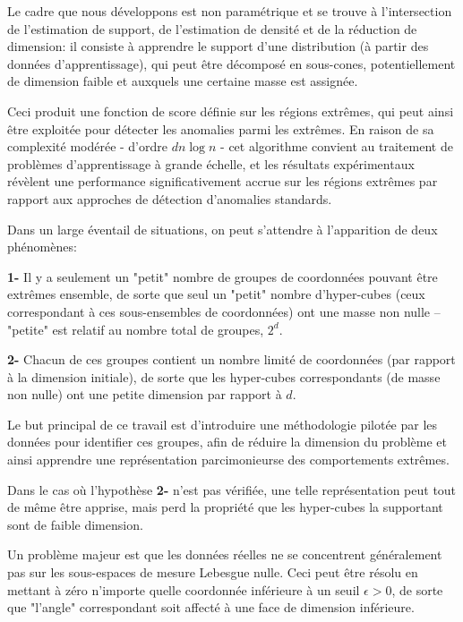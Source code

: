 Le cadre que nous développons est non paramétrique et se trouve à l'intersection de l'estimation de support, de l'estimation de densité et de la réduction de dimension: il consiste à apprendre le support d'une distribution (à partir des données d'apprentissage),  qui peut être décomposé en sous-cones, potentiellement de dimension faible et auxquels une certaine masse est assignée.%

Ceci produit une fonction de score définie sur les régions extrêmes, qui peut ainsi être exploitée pour détecter les anomalies parmi les extrêmes.
En raison de sa complexité modérée - d'ordre $ dn \log n $ - cet algorithme convient au traitement de problèmes d'apprentissage à grande échelle, et les résultats expérimentaux révèlent une performance significativement accrue sur les régions extrêmes par rapport aux approches de détection d'anomalies standards.


Dans un large éventail de situations, on peut s'attendre à l'apparition de deux phénomènes:

\textbf{1-} Il y a seulement un "petit" nombre de groupes de coordonnées pouvant être extrêmes ensemble, de sorte que seul un "petit" nombre d'hyper-cubes (ceux correspondant à ces sous-ensembles de coordonnées) ont une masse non nulle -- "petite" est relatif au nombre total de groupes, $2^d$.

\textbf{2-} Chacun de ces groupes contient un nombre limité de coordonnées (par rapport à la dimension initiale), de sorte que les hyper-cubes correspondants (de masse non nulle) ont une petite dimension par rapport à $ d $.

Le but principal de ce travail est d'introduire une méthodologie pilotée par les données pour identifier ces groupes, afin de réduire la
dimension du problème et ainsi apprendre une représentation parcimonieurse des comportements extrêmes.

Dans le cas où l'hypothèse \textbf{2-} n'est pas vérifiée, une telle représentation peut tout de même être apprise, mais perd la propriété que les hyper-cubes la supportant sont de faible dimension.

Un problème majeur est que les données réelles ne se concentrent généralement pas sur les sous-espaces de mesure Lebesgue nulle. Ceci peut être résolu en mettant à zéro n'importe quelle coordonnée inférieure à un seuil $ \epsilon> 0 $, de sorte que "l'angle" correspondant soit affecté à une face de dimension inférieure.

